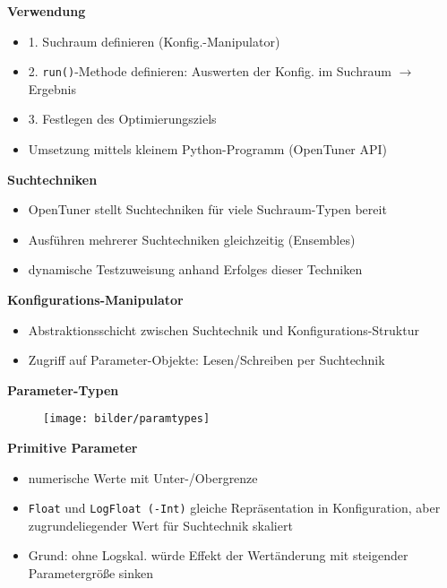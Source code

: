 
  \begin{frame}
  \textbf{Verwendung}
  \begin{itemize}
    \item 1. Suchraum definieren (Konfig.-Manipulator)
    \item 2. \texttt{run()}-Methode definieren: Auswerten der Konfig. im Suchraum $\rightarrow$ Ergebnis
    \item 3. Festlegen des Optimierungsziels
    \item Umsetzung mittels kleinem Python-Programm (OpenTuner API)
    
  \end{itemize}
  \textbf{Suchtechniken}
  \begin{itemize}
    \item OpenTuner stellt Suchtechniken für viele Suchraum-Typen bereit
    \item Ausführen mehrerer Suchtechniken gleichzeitig (Ensembles)
    \item dynamische Testzuweisung anhand Erfolges dieser Techniken
  \end{itemize}
  
  \textbf{Konfigurations-Manipulator}
  \begin{itemize}
    \item Abstraktionsschicht zwischen Suchtechnik und Konfigurations-Struktur
    \item Zugriff auf Parameter-Objekte: Lesen/Schreiben per Suchtechnik
    
  \end{itemize}
  \end{frame}
    
  \begin{frame}
    \textbf{Parameter-Typen}
    \begin{figure}[ht]
      \centering	      
      \texttt{[image: bilder/paramtypes]}
      \label{paramtypes}
    \end{figure}
    
  \textbf{Primitive Parameter}
  \begin{itemize}
    \item numerische Werte mit Unter-/Obergrenze
    \item \texttt{Float} und \texttt{LogFloat (-Int)} gleiche Repräsentation in Konfiguration, aber 
    zugrundeliegender Wert für Suchtechnik skaliert
    \item Grund: ohne Logskal. würde Effekt der Wertänderung mit steigender Parametergröße sinken
    
  \end{itemize}
  \end{frame}
  
